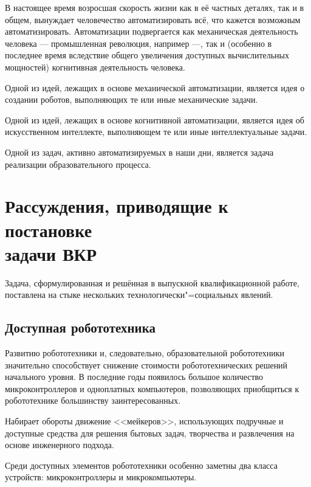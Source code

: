 
В настоящее время возросшая скорость жизни как в её частных деталях, так и в общем, вынуждает человечество автоматизировать всё, что кажется возможным автоматизировать. Автоматизации подвергается как механическая деятельность человека --- промышленная революция, например ---, так и (особенно в последнее время вследствие общего увеличения доступных вычислительных мощностей) когнитивная деятельность человека.

Одной из идей, лежащих в основе механической автоматизации, является идея о создании роботов, выполняющих те или иные механические задачи.

Одной из идей, лежащих в основе когнитивной автоматизации, является идея об искусственном интеллекте, выполняющем те или иные интеллектуальные задачи.

Одной из задач, активно автоматизируемых в наши дни, является задача реализации образовательного процесса.

\chapter*{Рассуждения, приводящие к постановке\\ задачи ВКР}
Задача, сформулированная и решённая в выпускной квалификационной работе, поставлена на стыке нескольких технологически"=социальных явлений.

\section*{Доступная робототехника}
Развитию робототехники и, следовательно, образовательной робототехники значительно способствует снижение стоимости робототехнических решений начального уровня. В последние годы появилось большое количество микроконтроллеров и одноплатных компьютеров, позволяющих приобщиться к робототехнике большинству заинтересованных.

Набирает обороты движение <<мейкеров>>, использующих подручные и доступные средства для решения бытовых задач, творчества и развлечения на основе инженерного подхода.

\label{popular-instruments}
Среди доступных элементов робототехники особенно заметны два класса устройств: микроконтроллеры и микрокомпьютеры.

